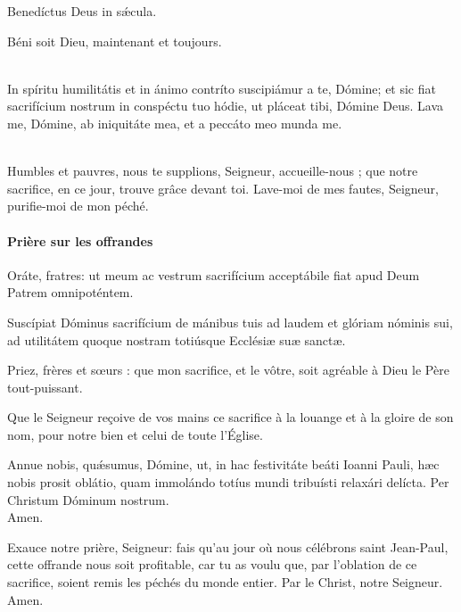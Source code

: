 \documentclass[twoside]{article}
\begin{document}
\begin{paracol}{2}
Benedíctus Deus in sǽcula. 

\switchcolumn

Béni soit Dieu, maintenant et toujours.

\switchcolumn*

\\
In spíritu humilitátis et in ánimo contríto
suscipiámur a te, Dómine;
et sic fiat sacrifícium nostrum in conspéctu tuo hódie,
ut pláceat tibi, Dómine Deus. 
Lava me, Dómine, ab iniquitáte mea,
et a peccáto meo munda me. 

\switchcolumn

~\\
Humbles et pauvres, nous te supplions, Seigneur, accueille-nous ; que notre sacrifice, en ce jour, trouve grâce devant toi. Lave-moi de mes fautes, Seigneur, purifie-moi de mon péché.
\end{paracol}

\paragraph{Prière sur les offrandes}
\begin{paracol}{2}

\vv Oráte, fratres:
ut meum ac vestrum sacrifícium
acceptábile fiat apud Deum Patrem omnipoténtem.

\rr Suscípiat Dóminus sacrifícium de mánibus tuis
ad laudem et glóriam nóminis sui,
ad utilitátem quoque nostram
totiúsque Ecclésiæ suæ sanctæ.

\switchcolumn

\vv Priez, frères et sœurs : que mon sacrifice, et le vôtre, soit agréable à Dieu le Père tout-puissant.

\rr Que le Seigneur reçoive de vos mains ce sacrifice à la louange et à la gloire de son nom, pour notre bien et celui de toute l’Église.

\switchcolumn*

Annue nobis, quǽsumus, Dómine,
ut, in hac festivitáte beáti Ioanni Pauli, hæc nobis prosit oblátio,
quam immolándo totíus mundi tribuísti relaxári delícta.
Per Christum Dóminum nostrum.\\
\rr Amen.

\switchcolumn
Exauce notre prière, Seigneur: fais qu'au jour où nous célébrons saint Jean-Paul, 
cette offrande nous soit profitable, car tu as voulu que, par l'oblation de ce sacrifice,
soient remis les péchés du monde entier. Par le Christ, notre Seigneur.\\
\rr Amen.

\end{paracol}
\end{document}
